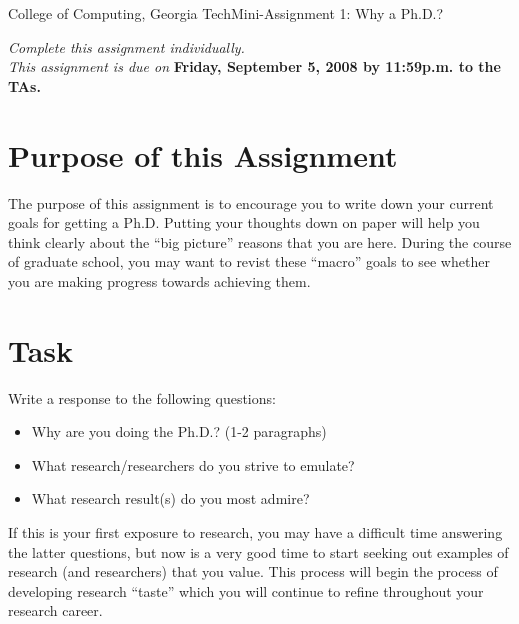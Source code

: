 \documentclass[11pt]{article}
\begin{document}


{College of Computing, Georgia Tech}{Mini-Assignment 1: Why a Ph.D.?}

{\em Complete this assignment individually. \\  This
  assignment is due on} {\bf Friday, September 5, 2008 by 11:59p.m. to
  the TAs.}

\section{Purpose of this Assignment}

The purpose of this assignment is to encourage you to write down your
current goals for getting a Ph.D.  Putting your thoughts down on paper
will help you think clearly about the ``big picture'' reasons that you
are here.  During the course of graduate school, you may want to revist
these ``macro'' goals to see whether you are making progress towards
achieving them.

\section{Task}

Write a response to the following questions:
\begin{itemize}
\itemsep=-1pt
    \item Why are you doing the Ph.D.? (1-2 paragraphs)
    \item What research/researchers do you strive to emulate?
    \item What research result(s) do you most admire?
\end{itemize}
\noindent
If this is your first exposure to research, you may have a difficult
time answering the latter questions, but now is a very good time to
start seeking out examples of research (and researchers) that you
value.  This process will begin the process of developing
research ``taste'' which you will continue to refine throughout your
research career.
\end{document}
